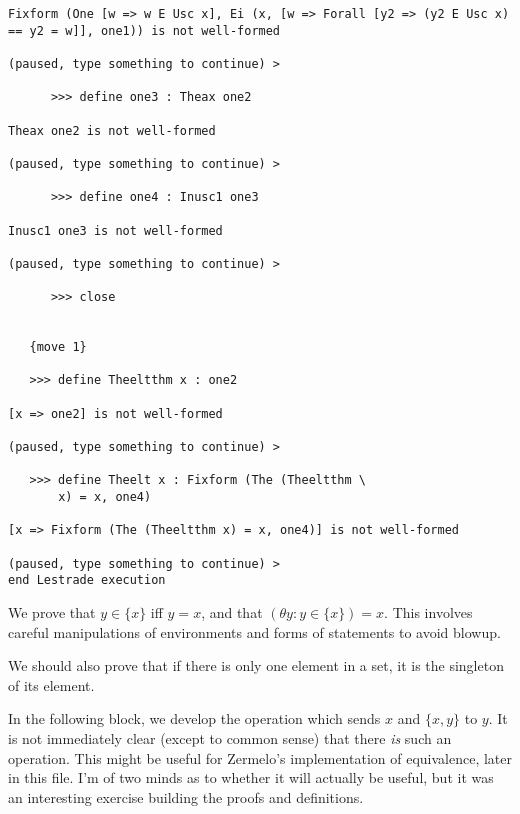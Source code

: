 \documentclass[12pt]{article}
\begin{document}
\begin{verbatim}
Fixform (One [w => w E Usc x], Ei (x, [w => Forall [y2 => (y2 E Usc x) == y2 = w]], one1)) is not well-formed

(paused, type something to continue) >

      >>> define one3 : Theax one2

Theax one2 is not well-formed

(paused, type something to continue) >

      >>> define one4 : Inusc1 one3

Inusc1 one3 is not well-formed

(paused, type something to continue) >

      >>> close


   {move 1}

   >>> define Theeltthm x : one2

[x => one2] is not well-formed

(paused, type something to continue) >

   >>> define Theelt x : Fixform (The (Theeltthm \
       x) = x, one4)

[x => Fixform (The (Theeltthm x) = x, one4)] is not well-formed

(paused, type something to continue) >
end Lestrade execution
\end{verbatim}

We prove that $y \in \{x\}$ iff $y=x$, and that $(\theta y: y \in \{x\})=x$.  This involves careful manipulations of environments and forms of statements to avoid blowup.

We should also prove that if there is only one element in a set, it is the singleton of its element.

In the following block, we develop the operation which sends $x$ and $\{x,y\}$ to $y$.  It is not immediately clear (except to common sense) that there
{\em is\/} such an operation.  This might be useful for Zermelo's implementation of equivalence, later in this file.  I'm of two minds as to whether it will actually be useful, but it was an interesting exercise building the proofs and definitions.
\end{document}
